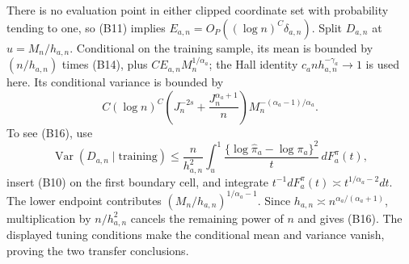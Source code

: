 There is no evaluation point in either clipped coordinate set with probability tending to one, so (B11) implies \(E_{a,n}=O_P((\log n)^C\delta_{a,n})\).  Split \(D_{a,n}\) at \(u=M_n/h_{a,n}\).  Conditional on the training sample, its mean is bounded by \((n/h_{a,n})\) times (B14), plus \(CE_{a,n}M_n^{1/\alpha_a}\); the Hall identity \(c_an h_{a,n}^{-\gamma_a}\to1\) is used here.  Its conditional variance is bounded by
\[
 C(\log n)^C
 \left(J_n^{-2s}+\frac{J_n^{\alpha_a+1}}n\right)
 M_n^{-(\alpha_a-1)/\alpha_a}.
\tag{B16}
\]
To see (B16), use
\[
 \operatorname{Var}(D_{a,n}\mid\text{training})
 \le\frac n{h_{a,n}^2}\int_u^1
 \frac{\{\log\widehat\pi_a-\log\pi_a\}^2}{t}\,dF_a^\pi(t),
\]
insert (B10) on the first boundary cell, and integrate \(t^{-1}dF_a^\pi(t)\asymp t^{1/\alpha_a-2}dt\).  The lower endpoint contributes \((M_n/h_{a,n})^{1/\alpha_a-1}\).  Since \(h_{a,n}\asymp n^{\alpha_a/(\alpha_a+1)}\), multiplication by \(n/h_{a,n}^2\) cancels the remaining power of \(n\) and gives (B16).  The displayed tuning conditions make the conditional mean and variance vanish, proving the two transfer conclusions.

